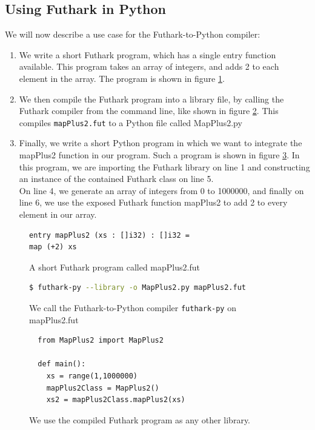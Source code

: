 \subsection*{Using Futhark in Python}
We will now describe a use case for the Futhark-to-Python compiler:
\begin{enumerate}
\item We write a short Futhark program, which has a single entry function
  available. This program takes an array of integers, and
adds 2 to each element in the array. The program is shown in figure \ref{fig:shortfutharkprogram0}. 
\item We then compile the Futhark program into a library file, by calling the
  Futhark compiler from the command line, like shown in figure \ref{fig:shortfutharkprogram1}.
This compiles \texttt{mapPlus2.fut} to a Python file called MapPlus2.py

\item Finally, we write a short Python program in which we want to integrate
  the mapPlus2 function in our program. Such a program is shown in figure \ref{fig:shortfutharkprogram2}.
  In this program, we are importing the Futhark library on line 1 and constructing
  an instance of the contained Futhark class on line 5.\\
  On line 4, we generate an array of integers from 0 to 1000000, and finally
  on line 6, we use the exposed Futhark function mapPlus2 to add 2 to every
  element in our array.
\end{enumerate}

\begin{figure}
\begin{lstlisting}[language=Futhark]
entry mapPlus2 (xs : []i32) : []i32 =
map (+2) xs
\end{lstlisting}
\caption{A short Futhark program called mapPlus2.fut}
\label{fig:shortfutharkprogram0}
\end{figure}

  \begin{figure}
\begin{lstlisting}[language=bash]
  $ futhark-py --library -o MapPlus2.py mapPlus2.fut
    \end{lstlisting}
    \caption{We call the Futhark-to-Python compiler \texttt{futhark-py} on
      mapPlus2.fut}
    \label{fig:shortfutharkprogram1}
  \end{figure}
  
  \begin{figure}
\begin{verbatim}
  from MapPlus2 import MapPlus2

  def main():
    xs = range(1,1000000)
    mapPlus2Class = MapPlus2()
    xs2 = mapPlus2Class.mapPlus2(xs)
  \end{verbatim}
    \caption{We use the compiled Futhark program as any other library.}
    \label{fig:shortfutharkprogram2}
  \end{figure}
\clearpage

